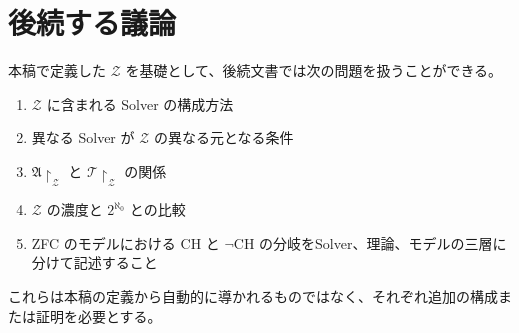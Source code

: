 \documentclass[a4paper,11pt]{jsarticle}
\begin{document}
\section{後続する議論}

本稿で定義した $\mathcal{Z}$ を基礎として、後続文書では次の問題を扱うことができる。

\begin{enumerate}
\item $\mathcal{Z}$ に含まれる Solver の構成方法
\item 異なる Solver が $\mathcal{Z}$ の異なる元となる条件
\item $\mathfrak{A}\restriction_{\mathcal{Z}}$ と $\mathcal{T}\restriction_{\mathcal{Z}}$ の関係
\item $\mathcal{Z}$ の濃度と $2^{\aleph_0}$ との比較
\item ZFC のモデルにおける CH と $\neg\mathrm{CH}$ の分岐をSolver、理論、モデルの三層に分けて記述すること
\end{enumerate}

これらは本稿の定義から自動的に導かれるものではなく、それぞれ追加の構成または証明を必要とする。
\end{document}
